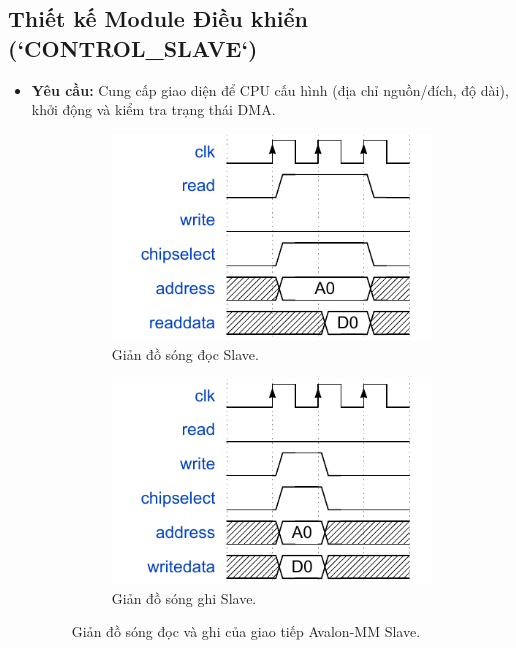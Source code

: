 \subsection{Thiết kế Module Điều khiển (`CONTROL\_SLAVE`)}
\begin{itemize}
    \item \textbf{Yêu cầu:} Cung cấp giao diện để CPU cấu hình (địa chỉ nguồn/đích, độ dài), khởi động và kiểm tra trạng thái DMA.
    
    \begin{figure}[htbp]
        \centering
        \begin{subfigure}[b]{0.48\textwidth}
            \centering
            \includegraphics[width=\linewidth]{Images/02_03_AvalonSlave_ReadWaveform.pdf}
            \caption{Giản đồ sóng đọc Slave.}
            \label{fig:02_03_avalon_slave_read_sub}
        \end{subfigure}
        \hfill
        \begin{subfigure}[b]{0.48\textwidth}
            \centering
            \includegraphics[width=\linewidth]{Images/02_04_AvalonSlave_WriteWaveform.pdf}
            \caption{Giản đồ sóng ghi Slave.}
            \label{fig:02_04_avalon_slave_write_sub}
        \end{subfigure}
        \caption{Giản đồ sóng đọc và ghi của giao tiếp Avalon-MM Slave.}
        \label{fig:avalon_slave_waveforms}
    \end{figure}
    

\end{itemize}
